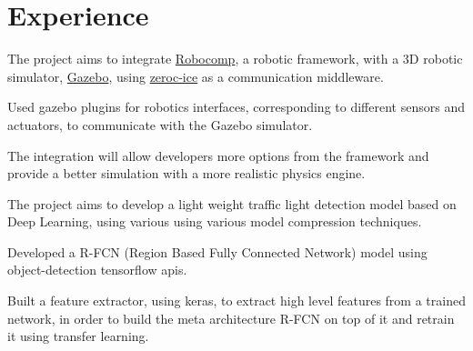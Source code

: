 \documentclass[]{deedy-resume-openfont}
\begin{document}
\lastupdated
{}

\section{Experience}

\begin{tightemize}
\item The project aims to integrate \href{https://robocomp.github.io/web/}{Robocomp}, a robotic framework, with a 3D robotic simulator, \href{http://gazebosim.org}{Gazebo}, using \href{https://doc.zeroc.com/ice/3.6/}{zeroc-ice} as a communication middleware.
\item Used gazebo plugins for robotics interfaces, corresponding to different sensors and actuators, to communicate with the Gazebo simulator.
\item The integration will allow developers more options from the framework and provide a better simulation with a more realistic physics engine.
\end{tightemize}
\sectionsep

\begin{tightemize}
\item The project aims to develop a light weight traffic light detection model based on Deep Learning, using various using various model compression techniques.
\item Developed a R-FCN (Region Based Fully Connected Network) model using object-detection tensorflow apis. 
\item Built a feature extractor, using keras, to extract high level features from a trained network, in order to build the meta architecture R-FCN on top of it and retrain it using transfer learning.
\end{tightemize}
\sectionsep
\end{document}

